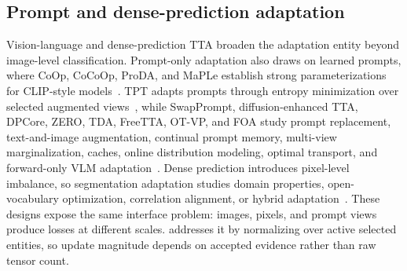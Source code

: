\subsection{Prompt and dense-prediction adaptation}

Vision-language and dense-prediction TTA broaden the adaptation entity beyond image-level classification. Prompt-only adaptation also draws on learned prompts, where CoOp, CoCoOp, ProDA, and MaPLe establish strong parameterizations for CLIP-style models~\citep{zhou2022learning,zhou2022conditional,khattak2022proda,khattak2023maple}. TPT adapts prompts through entropy minimization over selected augmented views~\citep{shu2022tpt}, while SwapPrompt, diffusion-enhanced TTA, DPCore, ZERO, TDA, FreeTTA, OT-VP, and FOA study prompt replacement, text-and-image augmentation, continual prompt memory, multi-view marginalization, caches, online distribution modeling, optimal transport, and forward-only VLM adaptation~\citep{ma2023swapprompt,feng2025diffusion,zhang2024dpcore,farina2024zero,karmanov2024tda,dai2025freetta,zhang2025otvp,niu2024foa}. Dense prediction introduces pixel-level imbalance, so segmentation adaptation studies domain properties, open-vocabulary optimization, correlation alignment, or hybrid adaptation~\citep{jeon2025exploiting,de2025test,you2025test,park2025hybrid}. These designs expose the same interface problem: images, pixels, and prompt views produce losses at different scales. \sane{} addresses it by normalizing \atlasloss{} over active selected entities, so update magnitude depends on accepted evidence rather than raw tensor count.
